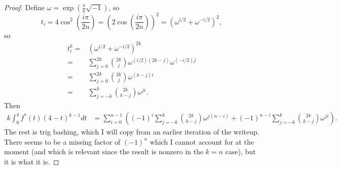 \documentclass{article}
\begin{document}
\begin{proof}
  Define $\omega = \exp\left(\frac{\pi}{n}\sqrt{-1}\right)$,
  so
  \[
  t_i = 4\cos^2\left(\frac{i\pi}{2n}\right)
  = \left(2\cos\left(\frac{i\pi}{2n}\right)\right)^2
  = (\omega^{i/2}+\omega^{-i/2})^2,
  \]
  so
  \begin{align*}
    t_i^k =& \left(\omega^{i/2}+\omega^{-i/2}\right)^{2k} \\
    =& \sum_{j=0}^{2k}\binom{2k}{j}\omega^{(i/2)(2k-j)}\omega^{(-i/2)j} \\
    =& \sum_{j=0}^{2k}\binom{2k}{j}\omega^{(k-j)i} \\
    =& \sum_{j=-k}^k\binom{2k}{k-j}\omega^{ji}.
  \end{align*}
  Then
  \begin{align*}
    k\int_0^4f^*(t)(4-t)^{k-1}dt
    &= \sum_{i=0}^{n-1}\left((-1)^i\sum_{j=-k}^k\binom{2k}{k-j}\omega^{j(n-i)}+(-1)^{n-i}\sum_{j=-k}^k\binom{2k}{k-j}\omega^{ji}\right).
  \end{align*}
  The rest is trig bashing, which I will copy from an earlier iteration of the writeup.
  There seems to be a missing factor of $(-1)^n$
  which I cannot account for at the moment
  (and which is relevant since the result is nonzero in the $k = n$ case),
  but it is what it is.


\end{proof}
\end{document}
